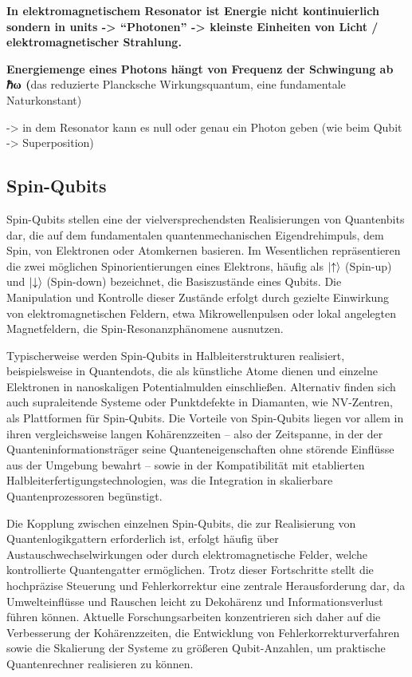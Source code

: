 \textbf{In elektromagnetischem Resonator ist Energie nicht kontinuierlich sondern in units -> “Photonen” -> kleinste Einheiten von Licht / elektromagnetischer Strahlung. }

\textbf{Energiemenge eines Photons hängt von Frequenz der Schwingung ab ℏω (}das reduzierte Plancksche Wirkungsquantum, eine fundamentale Naturkonstant) 

-> in dem Resonator kann es null oder genau ein Photon geben (wie beim Qubit -> Superposition) 

 \cite{nielsen_quantum_2010}
 
\subsection{Spin-Qubits}

Spin-Qubits stellen eine der vielversprechendsten Realisierungen von Quantenbits dar, die auf dem fundamentalen quantenmechanischen Eigendrehimpuls, dem Spin, von Elektronen oder Atomkernen basieren. Im Wesentlichen repräsentieren die zwei möglichen Spinorientierungen eines Elektrons, häufig als \(\ket{\uparrow}\) (Spin-up) und \(\ket{\downarrow}\) (Spin-down) bezeichnet, die Basiszustände eines Qubits. Die Manipulation und Kontrolle dieser Zustände erfolgt durch gezielte Einwirkung von elektromagnetischen Feldern, etwa Mikrowellenpulsen oder lokal angelegten Magnetfeldern, die Spin-Resonanzphänomene ausnutzen.

Typischerweise werden Spin-Qubits in Halbleiterstrukturen realisiert, beispielsweise in Quantendots, die als künstliche Atome dienen und einzelne Elektronen in nanoskaligen Potentialmulden einschließen. Alternativ finden sich auch supraleitende Systeme oder Punktdefekte in Diamanten, wie NV-Zentren, als Plattformen für Spin-Qubits. Die Vorteile von Spin-Qubits liegen vor allem in ihren vergleichsweise langen Kohärenzzeiten – also der Zeitspanne, in der der Quanteninformationsträger seine Quanteneigenschaften ohne störende Einflüsse aus der Umgebung bewahrt – sowie in der Kompatibilität mit etablierten Halbleiterfertigungstechnologien, was die Integration in skalierbare Quantenprozessoren begünstigt.

Die Kopplung zwischen einzelnen Spin-Qubits, die zur Realisierung von Quantenlogikgattern erforderlich ist, erfolgt häufig über Austauschwechselwirkungen oder durch elektromagnetische Felder, welche kontrollierte Quantengatter ermöglichen. Trotz dieser Fortschritte stellt die hochpräzise Steuerung und Fehlerkorrektur eine zentrale Herausforderung dar, da Umwelteinflüsse und Rauschen leicht zu Dekohärenz und Informationsverlust führen können. Aktuelle Forschungsarbeiten konzentrieren sich daher auf die Verbesserung der Kohärenzzeiten, die Entwicklung von Fehlerkorrekturverfahren sowie die Skalierung der Systeme zu größeren Qubit-Anzahlen, um praktische Quantenrechner realisieren zu können.

